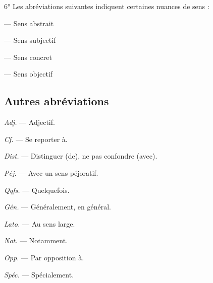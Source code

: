 6° Les abréviations suivantes indiquent certaines nuances de sens :

\vspace{0.211cm}
\hfill
\begin{minipage}[c]{.45\linewidth}
 — Sens abstrait

 — Sens subjectif

\end{minipage}
\hfill
\begin{minipage}[c]{.45\linewidth}
 — Sens concret

 — Sens objectif

\end{minipage}


\vspace{0.211cm}

\subsection {Autres abréviations}

\begin{minipage}[c]{.45\linewidth}
{\it Adj.} — Adjectif.

{\it Cf.} — Se reporter à.

{\it Dist.} — Distinguer (de), ne pas confondre (avec).

{\it Péj.} — Avec un sens péjoratif.

{\it Qqfs.} — Quelquefois.
\end{minipage}
\hfill
\begin{minipage}[c]{.45\linewidth}
{\it Gén.} — Généralement, en général.

{\it Lato.} — Au sens large.

{\it Not.} — Notamment.

{\it Opp.} — Par opposition à.

{\it Spéc.} — Spécialement.

\end{minipage}

